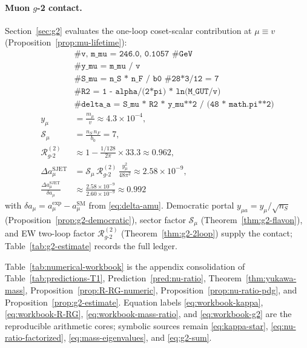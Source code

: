 \paragraph{Muon $g$-2 contact.}
Section~\ref{sec:g2} evaluates the one-loop coset-scalar contribution at
$\mu\equiv v$ (Proposition~\ref{prop:mu-lifetime}):
\begin{equation}\label{eq:workbook-g2}
\begin{aligned}
  &\texttt{\# v, m\_mu = 246.0, 0.1057  \# GeV}\\
  &\texttt{\# y\_mu = m\_mu / v}\\
  &\texttt{\# S\_mu = n\_S * n\_F / b0  \# 28*3/12 = 7}\\
  &\texttt{\# R2 = 1 - alpha/(2*pi) * ln(M\_GUT/v)}\\
  &\texttt{\# delta\_a = S\_mu * R2 * y\_mu**2 / (48 * math.pi**2)}\\
  y_\mu &= \frac{m_\mu}{v}\approx 4.3\times 10^{-4},\\
  \mathcal{S}_\mu &= \frac{n_S\,n_F}{b_0}=7,\\
  \mathcal{R}_{g\text{-}2}^{(2)}
  &\approx 1-\frac{1/128}{2\pi}\times 33.3
  \approx 0.962,\\
  \Delta a_\mu^{\mathrm{SJET}}
  &= \mathcal{S}_\mu\,\mathcal{R}_{g\text{-}2}^{(2)}\,
  \frac{y_\mu^2}{48\pi^2}
  \approx 2.58\times 10^{-9},\\
  \frac{\Delta a_\mu^{\mathrm{SJET}}}{\delta a_\mu}
  &\approx \frac{2.58\times 10^{-9}}{2.60\times 10^{-9}}
  \approx 0.992
\end{aligned}
\end{equation}
with $\delta a_\mu=a_\mu^{\mathrm{exp}}-a_\mu^{\mathrm{SM}}$ from
\eqref{eq:delta-amu}. Democratic portal
$y_{\mu a}=y_\mu/\sqrt{n_S}$ (Proposition~\ref{prop:g2-democratic}),
sector factor $\mathcal{S}_\mu$ (Theorem~\ref{thm:g2-flavon}), and EW
two-loop factor $\mathcal{R}_{g\text{-}2}^{(2)}$ (Theorem~\ref{thm:g2-2loop})
supply the contact; Table~\ref{tab:g2-estimate} records the full ledger.

\begin{remark}
Table~\ref{tab:numerical-workbook} is the appendix consolidation of
Table~\ref{tab:predictions-T1}, Prediction~\ref{pred:nu-ratio},
Theorem~\ref{thm:yukawa-mass}, Proposition~\ref{prop:R-RG-numeric},
Proposition~\ref{prop:nu-ratio-pdg}, and Proposition~\ref{prop:g2-estimate}.
Equation labels \eqref{eq:workbook-kappa}, \eqref{eq:workbook-R-RG},
\eqref{eq:workbook-mass-ratio}, and \eqref{eq:workbook-g2} are the reproducible
arithmetic cores; symbolic sources remain \eqref{eq:kappa-star},
\eqref{eq:nu-ratio-factorized}, \eqref{eq:mass-eigenvalues}, and
\eqref{eq:g2-sum}.
\end{remark}